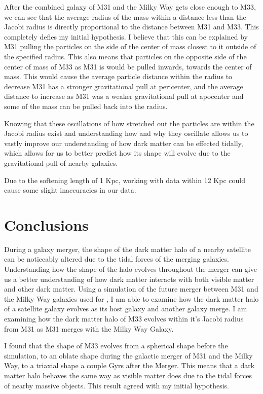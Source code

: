 \documentclass[fleqn,usenatbib]{mnras}
\begin{document}
    After the combined galaxy of M31 and the Milky Way gets close enough to M33, we can see that the average radius of the mass within a distance less than the Jacobi radius is directly proportional to the distance between M31 and M33. This completely defies my initial hypothesis. I believe that this can be explained by M31 pulling the particles on the side of the center of mass closest to it outside of the specified radius. This also means that particles on the opposite side of the center of mass of M33 as M31 is would be pulled inwards, towards the center of mass.  This would cause the average particle distance within the radius to decrease M31 has a stronger gravitational pull at pericenter, and the average distance to increase as M31 was a weaker gravitational pull at apocenter and some of the mass can be pulled back into the radius.

    Knowing that these oscillations of how stretched out the particles are within the Jacobi radius exist and understanding how and why they oscillate allows us to vastly improve our understanding of how dark matter can be effected tidally, which allows for us to better predict how its shape will evolve due to the gravitational pull of nearby galaxies.

    Due to the softening length of 1 Kpc, working with data within 12 Kpc could cause some slight inaccuracies in our data. 

\section{Conclusions}
    During a galaxy merger, the shape of the dark matter halo of a nearby satellite can be noticeably altered due to the tidal forces of the merging galaxies. Understanding how the shape of the halo evolves throughout the merger can give us a better understanding of how dark matter interacts with both visible matter and other dark matter. Using a simulation of the future merger between M31 and the Milky Way galaxies used for \citet{vanderMarel2012}, I am able to examine how the dark matter halo of a satellite galaxy evolves as its host galaxy and another galaxy merge. I am examining how the dark matter halo of M33 evolves within it's Jacobi radius from M31 as M31 merges with the Milky Way Galaxy.

    I found that the shape of M33 evolves from a spherical shape before the simulation, to an oblate shape during the galactic merger of M31 and the Milky Way, to a triaxial shape a couple Gyrs after the Merger.  This means that a dark matter halo behaves the same way as visible matter does due to the tidal forces of nearby massive objects. This result agreed with my initial hypothesis.
\end{document}

